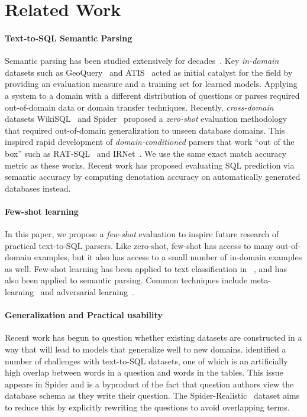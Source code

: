 \documentclass[11pt,a4paper]{article}
\begin{document}
 \section{Related Work}
\label{sec:related}

\paragraph{Text-to-SQL Semantic Parsing}
Semantic parsing has been studied extensively for decades~\cite{cacm-liang2016learning}.
Key \emph{in-domain} datasets such as GeoQuery~\cite{geoquery} and ATIS~\cite{atis} acted as initial catalyst for the 
field by providing an evaluation measure and a training set for learned models.
Applying a system to a domain with a different distribution of questions or parses required out-of-domain data or
domain transfer techniques.
Recently, \emph{cross-domain} datasets WikiSQL~\cite{zhong2017seq2sql} and
Spider~\cite{yu-etal-2018-spider} proposed a \emph{zero-shot} evaluation methodology that required out-of-domain
generalization to unseen database domains.
This inspired rapid development of \emph{domain-conditioned} parsers that work ``out of the box'' such as
RAT-SQL~\cite{wang-etal-2020-rat} and IRNet~\cite{irnet}. 
We use the same exact match accuracy metric as these works. Recent work \cite{zhong2020semantic} has proposed evaluating SQL prediction via semantic accuracy by computing denotation accuracy on automatically generated databases instead. 

\paragraph{Few-shot learning}
In this paper, we propose a \emph{few-shot} evaluation to inspire future research of practical text-to-SQL parsers.
Like zero-shot, few-shot has access to many out-of-domain examples, but it also has access to a small number of
in-domain examples as well.
Few-shot learning has been applied to text classification in ~\cite{mukherjee2020uncertainty}, and has also been applied to semantic parsing. Common techniques include meta-learning~\cite{huang2018natural,wang2020meta,li2021few,sun2020neural} and adversarial learning~\cite{li2020domain}. 

\paragraph{Generalization and Practical usability}
Recent work has begun to question whether existing datasets are constructed in a way that will lead to models that
generalize well to new domains.
\citet{suhr2020exploring} identified a number of challenges with text-to-SQL datasets, one of which is an artificially
high overlap between words in a question and words in the tables.
This issue appears in Spider and is a byproduct of the fact that question authors view the database schema as they write
their question.
The Spider-Realistic~\cite{deng2020structure} dataset aims to reduce this by explicitly rewriting the questions to avoid
overlapping terms.
\end{document}
